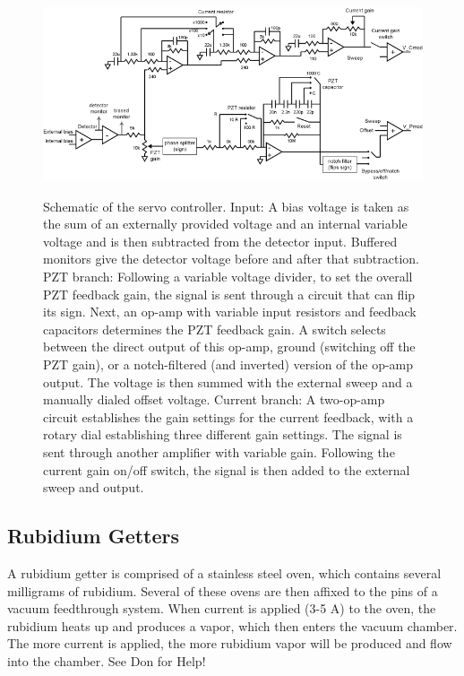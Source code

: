 \documentclass{../lab}
\begin{document}
\begin{figure}[h]
    \centering
    \href{http://experimentationlab.berkeley.edu/sites/default/files/images/Electronics_schematic_v2.png}{\includegraphics[width=0.7\linewidth]{images/Electronics_schematic_v2.png}}
    \caption{Schematic of the servo controller. Input: A bias voltage is taken as the sum of an externally provided voltage and an internal variable voltage and is then subtracted from the detector input. Buffered monitors give the detector voltage before and after that subtraction. PZT branch: Following a variable voltage divider, to set the overall PZT feedback gain, the signal is sent through a circuit that can flip its sign. Next, an op-amp with variable input resistors and feedback capacitors determines the PZT feedback gain. A switch selects between the direct output of this op-amp, ground (switching off the PZT gain), or a notch-filtered (and inverted) version of the op-amp output. The voltage is then summed with the external sweep and a manually dialed offset voltage. Current branch: A two-op-amp circuit establishes the gain settings for the current feedback, with a rotary dial establishing three different gain settings. The signal is sent through another amplifier with variable gain. Following the current gain on/off switch, the signal is then added to the external sweep and output.}
    \label{fig:SchematicOfServoController}
\end{figure}

\subsection{Rubidium Getters}

A rubidium getter is comprised of a stainless steel oven, which contains several milligrams of rubidium. Several of these ovens are then affixed to the pins of a vacuum feedthrough system. When current is applied (3-5 A) to the oven, the rubidium heats up and produces a vapor, which then enters the vacuum chamber. The more current is applied, the more rubidium vapor will be produced and flow into the chamber. See Don for Help!
\end{document}
